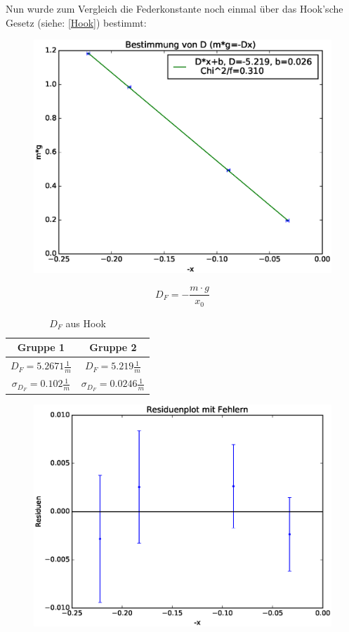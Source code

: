 \documentclass[12pt,a4paper]{article}
\begin{document}
Nun wurde zum Vergleich die Federkonstante noch einmal über das Hook'sche Gesetz (siehe: \ref{Hook}) bestimmt: 
\begin{figure}[H]
\caption{}
\centering
\includegraphics[scale=0.8]{Bilder/Hook_linreg.eps}
\end{figure}
\begin{equation*}
D_F=-\frac{m\cdot g}{x_0}
\end{equation*}
\begin{table}[H]\centering
\caption{$D_F$ aus Hook}
\begin{tabular}{c|c}
Gruppe 1 & Gruppe 2\\ 
\hline
$D_F=5.2671 \frac{1}{m}$& $D_F=5.219 \frac{1}{m}$\\ 
$\sigma_{D_F}=0.102 \frac{1}{m}$& $\sigma_{D_F}=0.0246 \frac{1}{m}$\\
\end{tabular} 
\end{table}
\begin{figure}[H]
\caption{}
\centering
\includegraphics[scale=0.8]{Bilder/Hook_residuen.eps}
\end{figure}
\end{document}
